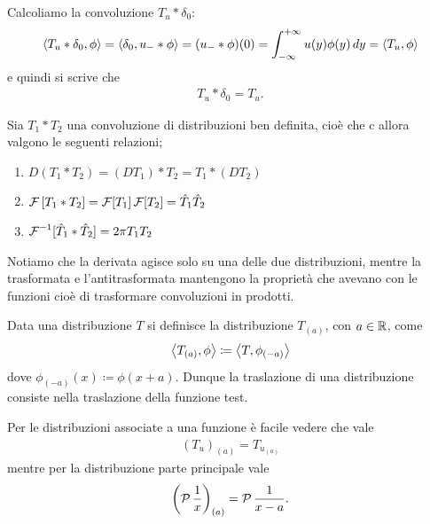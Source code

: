 \begin{example}
  Calcoliamo la convoluzione $ T_u * \delta_0 $:
  \begin{align}
    \sc{T_u * \delta_0, \phi} = \sc{\delta_0, u_-*\phi} = (u_- * \phi)(0) = \int_{-\infty}^{+\infty} u(y) \phi(y) \, dy = \sc{T_u, \phi}
  \end{align}
  e quindi si scrive che 
  \begin{align}
    T_u * \delta_0 = T_u.
  \end{align}
\end{example}

\begin{lemma}
  Sia $ T_1*T_2 $ una convoluzione di distribuzioni ben definita, cioè che c
  allora valgono le seguenti relazioni;
  \begin{enumerate}
    \item $ D(T_1*T_2) = (DT_1) * T_2 = T_1 * (DT_2)$
    \item $ \F\left[ T_1*T_2 \right] = \F[T_1] \F[T_2] = \hat{T}_1 \hat{T}_2 $
    \item $ \F^{-1}[\hat{T}_1 * \hat{T}_2] = 2\pi T_1T_2 $
  \end{enumerate}
\end{lemma}

\begin{remark}
  Notiamo che la derivata agisce solo su una delle due distribuzioni, mentre la trasformata e l'antitrasformata mantengono la proprietà che avevano con 
  le funzioni cioè di trasformare convoluzioni in prodotti.
\end{remark}

\begin{definition}
  Data una distribuzione $ T $ si definisce la distribuzione $ T_{(a)} $, con $ a \in \R $, come 
  \begin{align}
    \sca{T_{(a)}, \phi}\coloneq \sca{T, \phi_{(-a)}}
  \end{align}
  dove $ \phi_{(-a)}(x) \coloneq \phi(x + a) $. Dunque la traslazione di una distribuzione consiste nella traslazione della funzione test.
\end{definition}

Per le distribuzioni associate a una funzione è facile vedere che vale 
\begin{align}
  (T_u)_{(a)} = T_{u_{(a)}}
\end{align}
mentre per la distribuzione parte principale vale 
\begin{align}
  \left( \P\frac1x \right)_{(a)} = \P\frac1{x-a}.
\end{align}

